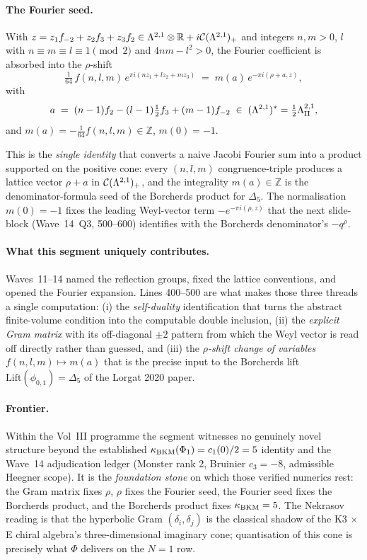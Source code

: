 \paragraph{The Fourier seed.} With $z = z_1 f_{-2} + z_2 f_3 + z_3 f_2
\in \Lambda^{2,1}\otimes\mathbb{R} + i\mathcal{C}(\Lambda^{2,1})_+$ and
integers $n,m > 0$, $l$ with $n \equiv m \equiv l \equiv 1 \pmod 2$
and $4nm - l^2 > 0$, the Fourier coefficient is absorbed into the
$\rho$-shift
\[
  \tfrac{1}{64}\,f(n,l,m)\,e^{\pi i(nz_1+lz_2+mz_3)}
  \;=\; m(a)\,e^{-\pi i(\rho+a,z)},
\]
with
\[
  a \;=\; (n-1)f_2 - (l-1)\tfrac{1}{2}f_3 + (m-1)f_{-2}
       \;\in\; (\Lambda^{2,1})^{*} = \tfrac{1}{2}\Lambda^{2,1}_{\mathrm{II}},
\]
and $m(a) = -\tfrac{1}{64} f(n,l,m) \in \mathbb{Z}$, $m(0) = -1$.

This is the \emph{single identity} that converts a naive Jacobi
Fourier sum into a product supported on the positive cone: every
$(n,l,m)$ congruence-triple produces a lattice vector $\rho + a$ in
$\mathcal{C}(\Lambda^{2,1})_+$, and the integrality $m(a) \in \mathbb{Z}$ is the
denominator-formula seed of the Borcherds product for $\Delta_5$. The
normalisation $m(0) = -1$ fixes the leading Weyl-vector term
$-e^{-\pi i(\rho,z)}$ that the next slide-block (Wave~14~Q3, 500–600)
identifies with the Borcherds denominator's $-q^{\rho}$.

\paragraph{What this segment uniquely contributes.} Waves~11–14
named the reflection groups, fixed the lattice conventions, and
opened the Fourier expansion. Lines 400–500 are what makes those
three threads a single computation: (i) the \emph{self-duality}
identification that turns the abstract finite-volume condition into
the computable double inclusion, (ii) the \emph{explicit Gram matrix}
with its off-diagonal $\pm 2$ pattern from which the Weyl vector is
read off directly rather than guessed, and (iii) the
\emph{$\rho$-shift change of variables} $f(n,l,m) \mapsto m(a)$ that
is the precise input to the Borcherds lift
$\mathrm{Lift}(\phi_{0,1}) = \Delta_5$ of the Lorgat 2020 paper.

\paragraph{Frontier.} Within the Vol~III programme the segment
witnesses no genuinely novel structure beyond the established
$\kappa_{\mathrm{BKM}}(\Phi_1) = c_1(0)/2 = 5$ identity and the Wave~14
adjudication ledger (Monster rank 2, Bruinier $c_3 = -8$, admissible
Heegner scope). It is the \emph{foundation stone} on which those
verified numerics rest: the Gram matrix fixes $\rho$, $\rho$ fixes the
Fourier seed, the Fourier seed fixes the Borcherds product, and the
Borcherds product fixes $\kappa_{\mathrm{BKM}} = 5$. The Nekrasov reading is that the
hyperbolic Gram $(\delta_i,\delta_j)$ is the classical shadow of the
K3 $\times$ E chiral algebra's three-dimensional imaginary cone;
quantisation of this cone is precisely what $\Phi$ delivers on the
$N=1$ row.
